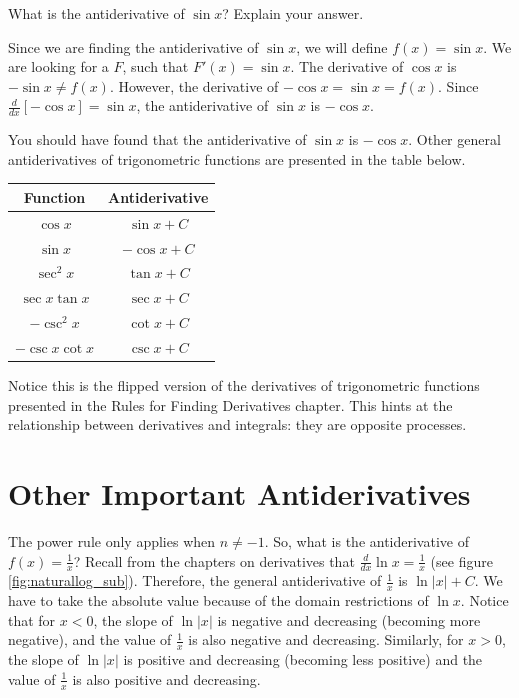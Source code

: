 \begin{Exercise}[label=triganti]
What is the antiderivative of $\sin{x}$? Explain your answer. 
\end{Exercise}

\begin{Answer}[ref=triganti]
Since we are finding the antiderivative of $\sin{x}$, we will define 
$f(x) = \sin{x}$. We are looking for a $F$, such that $F'(x) = \sin{x}$. 
The derivative of $\cos{x}$ is $-\sin{x} \neq f(x)$. However, the derivative 
of $-\cos{x} = \sin{x} = f(x)$. Since $\frac{d}{dx} [-\cos{x}] = 
\sin{x}$, the antiderivative of $\sin{x}$ is $-\cos{x}$. 
\end{Answer}

You should have found that the antiderivative of $\sin{x}$ is 
$-\cos{x}$. Other general antiderivatives of trigonometric functions 
are presented in the table below. 

\begin{center}
	\begin{tabular}{|c|c|}\hline
		Function & Antiderivative\\
		\hline
		$\cos{x}$ & $\sin{x} + C$\\
		\hline
		$\sin{x}$ & $-\cos{x} + C$\\
		\hline
		$\sec^2{x}$ & $\tan{x} + C$\\
		\hline
		$\sec{x} \tan{x}$ & $\sec{x} + C$\\
		\hline
		$-\csc^2{x}$ & $\cot{x} + C$\\
		\hline
		$-\csc{x} \cot{x}$ & $\csc{x} + C$\\
		\hline
	\end{tabular}
\end{center}


Notice this is the flipped version of the derivatives of trigonometric 
functions presented in the Rules for Finding Derivatives chapter. This hints 
at the relationship between derivatives and integrals: they are 
opposite processes. 

\section{Other Important Antiderivatives}
The power rule only applies when $n\neq-1$. So, what is the 
antiderivative of $f(x) = \frac{1}{x}$? Recall from the chapters on 
derivatives that $\frac{d}{dx} \ln{x} = \frac{1}{x}$ (see figure 
\ref{fig:naturallog_sub}). Therefore, the general antiderivative of 
$\frac{1}{x}$ is $\ln{|x|} + C$. We have to take the absolute value 
because of the domain restrictions of $\ln{x}$. Notice that for $x<0$, 
the slope of $\ln{|x|}$ is negative and decreasing (becoming more 
negative), and the value of $\frac{1}{x}$ is also negative and 
decreasing. Similarly, for $x>0$, the slope of $\ln{|x|}$ is positive 
and decreasing (becoming less positive) and the value of $\frac{1}{x}$ 
is also positive and decreasing. 

